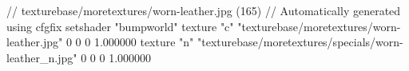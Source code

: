 // texturebase/moretextures/worn-leather.jpg (165)
// Automatically generated using cfgfix
setshader "bumpworld"
texture "c" "texturebase/moretextures/worn-leather.jpg" 0 0 0 1.000000
texture "n" "texturebase/moretextures/specials/worn-leather_n.jpg" 0 0 0 1.000000
